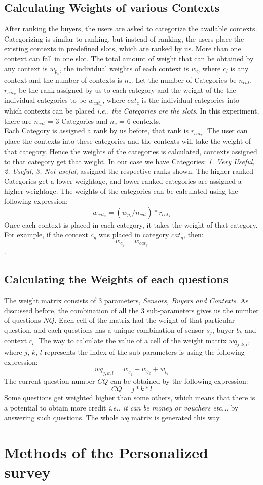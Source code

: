 \subsection{Calculating Weights of various Contexts}
After ranking the buyers, the users are asked to categorize the available contexts. Categorizing is similar to ranking, but instead of ranking, the users
place the existing contexts in predefined slots, which are ranked by us. More than one context can fall in one slot. The total amount of weight that can be 
obtained by any context is $w_{p_{c}}$, the individual weights of each context is $w_{c_{l}}$  where $c_l$ is any context and the number of contexts is $n_c$. Let the number of Categories be $n_{cat}$, $r_{cat_{k}}$ be the rank assigned by us to
each category and the weight
of the the individual categories to be $w_{cat_{z}}$, where $cat_z$ is the individual categories into which contexts can be placed {\it i.e.. the Categories are the slots}. In this experiment, there are $n_{cat}$ = 3 Categories
and $n_c$ = 6 contexts.\\
Each Category is assigned a rank by us before, that rank is $r_{cat_{z}}$. The user can place the contexts into these categories and the contexts will take the weight of that category.
Hence the weights of the categories is calculated, contexts assigned to that category get that weight. In our case we have Categories: {\it 1. Very Useful, 2. Useful, 3. Not useful}, assigned the respective ranks shown.
The higher ranked Categories get a lower weightage, and lower ranked categories are assigned a higher weightage. The weights of the categories can be calculated using the following expression:
$$w_{cat_{z}} = (w_{p_{c}}/n_{cat})*r_{cat_{k}}$$
Once each context is placed in each category, it takes the weight of that category. For example, if the context $c_y$ was placed in category $cat_g$, then:
$$w_{c_{y}} = w_{cat_{g}}$$.

\subsection{Calculating the Weights of each questions}
The weight matrix consists of 3 parameters, {\it Sensors, Buyers and Contexts}. As discussed before, the combination
of all the 3 sub-parameters gives us the number of questions $NQ$. Each cell of the matrix had the weight of that particular question,
and each questions has a unique combination of sensor $s_j$, buyer $b_k$ and context $c_l$. The way to calculate the value of a cell of the weight matrix $wq_{j,k,l}$, where $j$, $k$, $l$
represents the index of the sub-parameters
is using the following expression:
$$wq_{j,k,l} = w_{s_{j}} + w_{b_{k}} + w_{c_{l}}$$
The current question number $CQ$ can be obtained by the following expression:
 $$CQ = j*k*l$$
Some questions get weighted higher than some others, which means that there is a potential
to obtain more credit {\it i.e.. it can be money or vouchers etc...} by answering such questions. The whole $wq$ matrix is generated this way.

\section{Methods of the Personalized survey}

